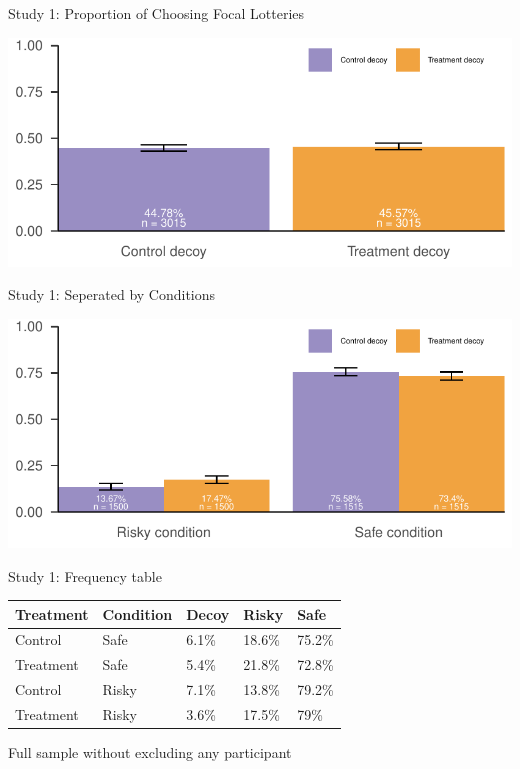 \documentclass[
  ignorenonframetext,
  aspectratio=169]{beamer}
\begin{document}
\begin{frame}{Study 1: Proportion of Choosing Focal Lotteries}
\label{study-1-proportion-of-choosing-focal-lotteries}
\begin{flushright}\includegraphics{BDR_Lab_0929_files/figure-beamer/unnamed-chunk-2-1} \end{flushright}
\end{frame}

\begin{frame}{Study 1: Seperated by Conditions}
\label{study-1-seperated-by-conditions}
\begin{flushright}\includegraphics{BDR_Lab_0929_files/figure-beamer/unnamed-chunk-3-1} \end{flushright}
\end{frame}

\begin{frame}{Study 1: Frequency table}
\label{study-1-frequency-table}
\begin{table}
\centering
\begin{tabular}{lllll}
\toprule
Treatment & Condition & Decoy & Risky & Safe\\
\midrule
Control & Safe & 6.1\% & 18.6\% & 75.2\%\\
Treatment & Safe & 5.4\% & 21.8\% & 72.8\%\\
Control & Risky & 7.1\% & 13.8\% & 79.2\%\\
Treatment & Risky & 3.6\% & 17.5\% & 79\%\\
\bottomrule
\end{tabular}
\end{table}

\vfill

\hfill \tiny *Full sample without excluding any participant
\end{frame}
\end{document}
